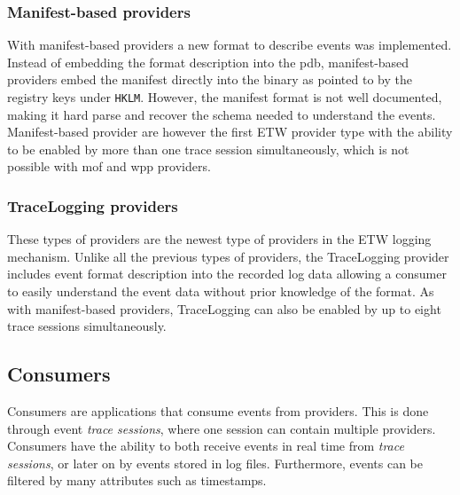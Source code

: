 \documentclass{report}
\begin{document}
\subsubsection{Manifest-based providers}
\label{sec:etw:providers:manifest-based}
With manifest-based providers a new format to describe events was implemented. Instead of embedding the format description into the \gls{pdb}, manifest-based providers embed the manifest directly into the binary as pointed to by the registry keys under \texttt{HKLM\SOFTWARE\Microsoft\Windows\CurrentVersion\WINEVT\Publishers}. However, the manifest format is not well documented, making it hard parse and recover the schema needed to understand the events\cite{url:etw:various-information}. Manifest-based provider are however the first \gls{ETW} provider type with the ability to be enabled by more than one trace session simultaneously, which is not possible with \gls{mof} and \gls{wpp} providers.

\subsubsection{TraceLogging providers}
These types of providers are the newest type of providers in the \gls{ETW} logging mechanism. Unlike all the previous types of providers, the TraceLogging provider includes event format description into the recorded log data\cite{url:etw:provider-types} allowing a consumer to easily understand the event data without prior knowledge of the format. As with manifest-based providers, TraceLogging can also be enabled by up to eight trace sessions simultaneously.

\subsection{Consumers}
Consumers are applications that consume events from providers. This is done through event \emph{trace sessions}, where one session can contain multiple providers. Consumers have the ability to both receive events in real time from \emph{trace sessions}, or later on by events stored in log files. Furthermore, events can be filtered by many attributes such as timestamps.
\end{document}

